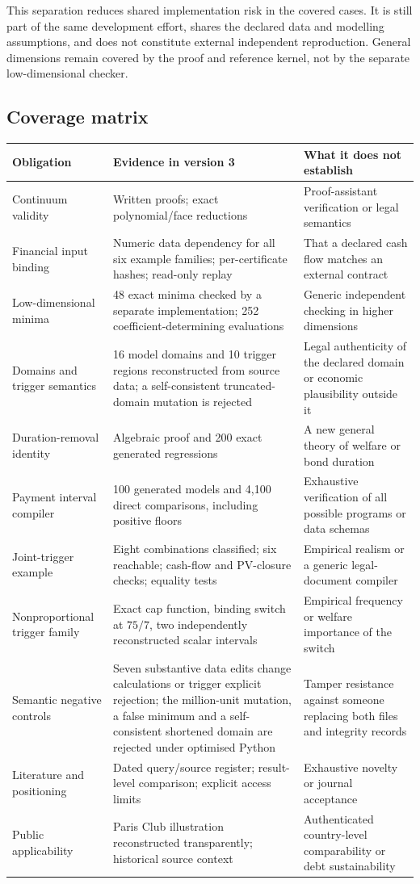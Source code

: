 \documentclass[11pt,a4paper]{article}
\begin{document}
This separation reduces shared implementation risk in the covered cases. It is still part of the same development effort, shares the declared data and modelling assumptions, and does not constitute external independent reproduction. General dimensions remain covered by the proof and reference kernel, not by the separate low-dimensional checker.

\subsection{Coverage matrix}
\small
\begin{longtable}{p{}p{}p{}}
\toprule Obligation & Evidence in version 3 & What it does not establish\\\midrule\endhead
Continuum validity & Written proofs; exact polynomial/face reductions & Proof-assistant verification or legal semantics\\
Financial input binding & Numeric data dependency for all six example families; per-certificate hashes; read-only replay & That a declared cash flow matches an external contract\\
Low-dimensional minima & 48 exact minima checked by a separate implementation; 252 coefficient-determining evaluations & Generic independent checking in higher dimensions\\
Domains and trigger semantics & 16 model domains and 10 trigger regions reconstructed from source data; a self-consistent truncated-domain mutation is rejected & Legal authenticity of the declared domain or economic plausibility outside it\\
Duration-removal identity & Algebraic proof and 200 exact generated regressions & A new general theory of welfare or bond duration\\
Payment interval compiler & 100 generated models and 4,100 direct comparisons, including positive floors & Exhaustive verification of all possible programs or data schemas\\
Joint-trigger example & Eight combinations classified; six reachable; cash-flow and PV-closure checks; equality tests & Empirical realism or a generic legal-document compiler\\
Nonproportional trigger family & Exact cap function, binding switch at $75/7$, two independently reconstructed scalar intervals & Empirical frequency or welfare importance of the switch\\
Semantic negative controls & Seven substantive data edits change calculations or trigger explicit rejection; the million-unit mutation, a false minimum and a self-consistent shortened domain are rejected under optimised Python & Tamper resistance against someone replacing both files and integrity records\\
Literature and positioning & Dated query/source register; result-level comparison; explicit access limits & Exhaustive novelty or journal acceptance\\
Public applicability & Paris Club illustration reconstructed transparently; historical source context & Authenticated country-level comparability or debt sustainability\\\bottomrule
\end{longtable}
\end{document}

